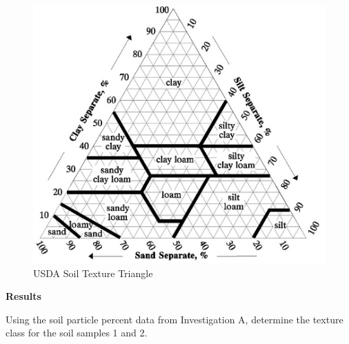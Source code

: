 \documentclass[
  letterpaper,
  twocolumn,
  portrait]{scrbook}
\begin{document}
\begin{figure}

{\centering \includegraphics{texture-triangle-Picture1.png}

}

\caption{\label{fig-triangle}USDA Soil Texture Triangle}

\end{figure}

\textbf{Results}

Using the soil particle percent data from Investigation A, determine the
texture class for the soil samples 1 and 2.

 
  \providecommand{\huxb}[2]{\arrayrulecolor[RGB]{#1}\global\arrayrulewidth=#2pt}
  \providecommand{\huxvb}[2]{\color[RGB]{#1}\vrule width #2pt}
  \providecommand{\huxtpad}[1]{\rule{0pt}{#1}}
  \providecommand{\huxbpad}[1]{\rule[-#1]{0pt}{#1}}
\end{document}
